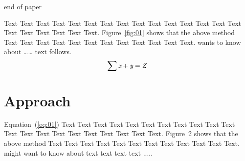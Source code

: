 \documentclass{bioinfo}
\begin{document}
\newpage
end of paper
\newpage

Text Text Text Text Text Text  Text Text Text Text Text Text Text
Text Text  Text Text Text Text Text Text. Figure~\ref{fig:01}
shows that the above method  Text Text Text Text  Text Text Text
Text Text Text  Text Text.  \citep{Bag01} wants to know about
{\ldots}{\ldots} text follows.
\begin{equation}
\sum \text{\it x}+ \text{\it y} =\text{\it Z}\label{eq:01}\vspace*{-10pt}
\end{equation}


\section{Approach}

Equation~(\ref{eq:01}) Text Text Text Text Text Text  Text Text
Text Text Text Text Text Text Text Text Text Text Text Text Text.
Figure~2\vphantom{\ref{fig:02}} shows that the above method  Text
Text Text Text  Text Text Text Text Text Text  Text Text.
\citealp{Boffelli03} might want to know about text text text text
.....
\end{document}
